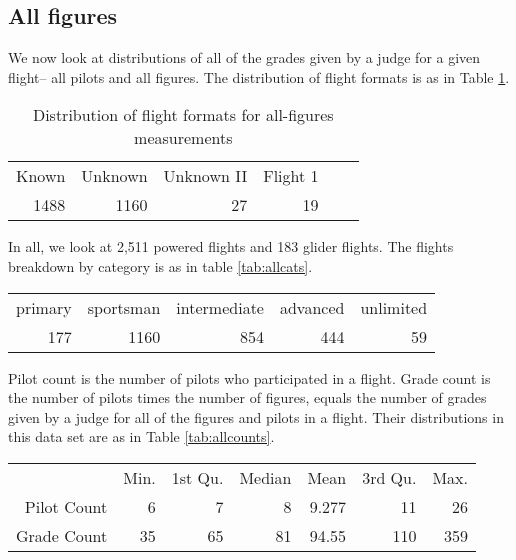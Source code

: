 \subsection{All figures}

We now look at distributions of all of the grades given by a judge for
a given flight-- all pilots and all figures.
The distribution of flight formats is as in Table \ref{tab:allformat}.

\begin{table}[tbp]
  \centering
  \begin{tabular}{r r r r r r}
  Known & Unknown & Unknown II & Flight 1 \\
  1488 & 1160 & 27 & 19 \\
  \end{tabular}
  \caption{Distribution of flight formats for all-figures measurements}
  \label{tab:allformat}
\end{table}

In all, we look at 2,511 powered flights and 183 glider flights. The flights
breakdown by category is as in table \ref{tab:allcats}.

\begin{table*}[tbp]
  \begin{tabular}{r r r r r}
  primary  & sportsman & intermediate  &  advanced  & unlimited  \\
      177  &      1160 &          854  &       444  &        59  \\
  \end{tabular}
  \caption{Distribution of categories for all-figures measurements}
  \label{tab:allcats}
\end{table*}

Pilot count is the number of pilots who participated in a flight.
Grade count is the number of pilots times the number of figures, equals
the number of grades given by a judge for all of the figures and pilots in
a flight. Their distributions in this data set are as in
Table \ref{tab:allcounts}.

\begin{table*}[tbp]
  \begin{tabular}{r | r r r r r r}
  & Min. & 1st Qu. & Median & Mean & 3rd Qu. & Max. \\
  Pilot Count &  6 &  7 &  8 & 9.277 &  11 &  26 \\
  Grade Count & 35 & 65 & 81 & 94.55 & 110 & 359 \\
  \end{tabular}
  \caption{Distribution of pilot and grade counts for all-figures measurements}
  \label{tab:allcounts}
\end{table*}

